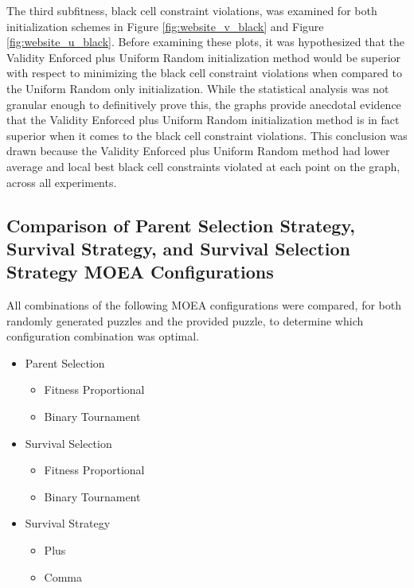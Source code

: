 \documentclass[11pt]{article}
\begin{document}
The third subfitness, black cell constraint violations, was examined for both initialization
schemes in Figure \ref{fig:website_v_black} and Figure \ref{fig:website_u_black}. Before examining
these plots, it was hypothesized that the Validity Enforced plus Uniform Random initialization 
method would be superior with respect to minimizing the black cell constraint violations when compared
to the Uniform Random only initialization. While the statistical analysis was not granular enough to
definitively prove this, the graphs provide anecdotal evidence that the Validity Enforced plus Uniform
Random initialization method is in fact superior when it comes to the black cell constraint violations.
This conclusion was drawn because the Validity Enforced plus Uniform Random method had lower average and
local best black cell constraints violated at each point on the graph, across all experiments.


\subsection{Comparison of Parent Selection Strategy, Survival Strategy, and Survival Selection Strategy
MOEA Configurations}

All combinations of the following MOEA configurations were compared, for both randomly generated 
puzzles and the provided puzzle, to determine which configuration combination was optimal.

\begin{itemize}
    \item Parent Selection
    \begin{itemize}
        \item Fitness Proportional
        \item Binary Tournament
    \end{itemize}

    \item Survival Selection
    \begin{itemize}
        \item Fitness Proportional
        \item Binary Tournament
    \end{itemize}

    \item Survival Strategy 
    \begin{itemize}
        \item Plus
        \item Comma
    \end{itemize}
\end{itemize}
\end{document}
